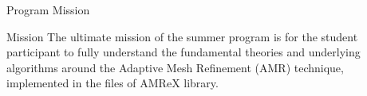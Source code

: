 \documentclass[\string~/GitHub/sthlmNordBeamerTheme/sthlmNordLightDemo.tex]{subfiles}
\begin{document}
\begin{frame}[c]{Program Mission}
    \begin{block}{Mission}
        The ultimate mission of the summer program is for the student participant to fully understand the fundamental theories and underlying algorithms around the Adaptive Mesh Refinement (AMR) technique, implemented in the files of AMReX library.
    \end{block}
 
\end{frame}
\end{document}
